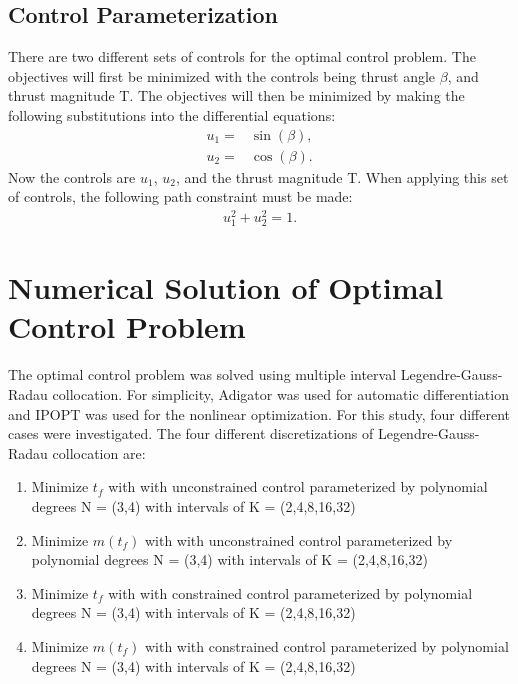 \documentclass[]{article}
\begin{document}
	\subsection{Control Parameterization}
	There are two different sets of controls for the optimal control problem. The objectives will first be minimized with the controls being thrust angle \(\beta\), and thrust magnitude T. The objectives will then be minimized by making the following substitutions into the differential equations:
	\begin{align}                                                                                                                                                                        
    	u_1 =& \sin(\beta), \label{u1_control}\\
    	u_2 =& \cos(\beta). \label{u2_control}
	\end{align}
	Now the controls are \(u_1\), \(u_2\), and the thrust magnitude T. When applying this set of controls, the following path constraint must be made:
	\begin{align}                                                                                                                                                                        
		u_1^2 + u_2^2 = 1. \label{path_constraint}
	\end{align}
	
	\section{Numerical Solution of Optimal Control Problem}
	The optimal control problem was solved using multiple interval Legendre-Gauss-Radau collocation. For simplicity, Adigator was used for automatic differentiation and IPOPT was used for the nonlinear optimization. For this study, four different cases were investigated. The four different discretizations of Legendre-Gauss-Radau collocation are:
	\begin{enumerate}
		\item Minimize \(t_f\) with with unconstrained control parameterized by polynomial degrees N = (3,4) with intervals of K = (2,4,8,16,32)
		\item Minimize \(m(t_f)\) with with unconstrained control parameterized by polynomial degrees N = (3,4) with intervals of K = (2,4,8,16,32)
		\item Minimize \(t_f\) with with constrained control parameterized by polynomial degrees N = (3,4) with intervals of K = (2,4,8,16,32)
		\item Minimize \(m(t_f)\) with with constrained control parameterized by polynomial degrees N = (3,4) with intervals of K = (2,4,8,16,32)
	\end{enumerate}
%     
\end{document}

